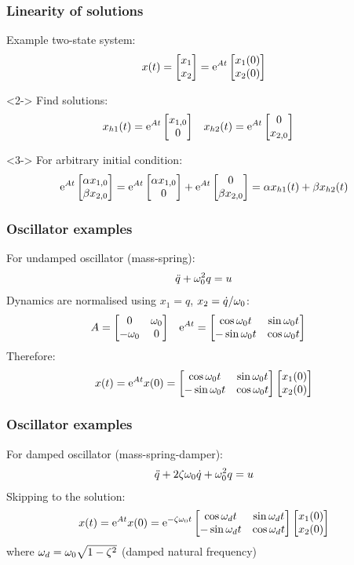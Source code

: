 \documentclass{beamer-control}
\begin{document}
\begin{frame}
\frametitle{Linearity of solutions}
Example two-state system:
\begin{align}
x(t) = \begin{bmatrix}x_1\\x_2\end{bmatrix} = \mathrm{e}^{At}\begin{bmatrix}x_1(0)\\x_2(0)\end{bmatrix}
\end{align}
\begin{uncoverenv}<2->
Find solutions:
\begin{align}
x_{h1}(t) &= \mathrm{e}^{At}\begin{bmatrix}x_{1,0}\\0\end{bmatrix} &
x_{h2}(t) &= \mathrm{e}^{At}\begin{bmatrix}0\\x_{2,0}\end{bmatrix} 
\end{align}
\end{uncoverenv}
\begin{uncoverenv}<3->
For arbitrary initial condition:
\begin{align}
\mathrm{e}^{At}\begin{bmatrix}\alpha x_{1,0}\\\beta x_{2,0}\end{bmatrix} = \mathrm{e}^{At}\begin{bmatrix}\alpha x_{1,0}\\0\end{bmatrix} + \mathrm{e}^{At}\begin{bmatrix}0\\\beta x_{2,0}\end{bmatrix} = \alpha x_{h1}(t) + \beta x_{h2}(t)
\end{align}
\end{uncoverenv}
\end{frame}

\begin{frame}
\frametitle{Oscillator examples}
For undamped oscillator (mass-spring):
\begin{align}
\ddot q + \omega_0^2 q  = u
\end{align}
Dynamics are normalised using $x_1=q$, $x_2 = \dot q/\omega_0$:
\begin{align}
A &= \begin{bmatrix}0 & \omega_0\\ -\omega_0 & 0\end{bmatrix} & \mathrm{e}^{At} &= \begin{bmatrix} \cos \omega_0 t & \sin \omega_0 t \\ -\sin \omega_0 t & \cos \omega_0 t\end{bmatrix}
\end{align}
Therefore:
\begin{align}
x(t) = \mathrm{e}^{At} x(0) = \begin{bmatrix} \cos \omega_0 t & \sin \omega_0 t \\ -\sin \omega_0 t & \cos \omega_0 t\end{bmatrix} \begin{bmatrix}x_1(0)\\ x_2(0)\end{bmatrix}
\end{align}
\end{frame}

\begin{frame}
\frametitle{Oscillator examples}
For damped oscillator (mass-spring-damper):
\begin{align}
\ddot q + 2 \zeta \omega_0 \dot q + \omega_0^2 q  = u
\end{align}
Skipping to the solution:
\begin{align}
x(t) = \mathrm{e}^{At} x(0) = \mathrm{e}^{-\zeta\omega_0 t} \begin{bmatrix} \cos \omega_d t & \sin \omega_d t \\ -\sin \omega_d t & \cos \omega_d t\end{bmatrix} \begin{bmatrix}x_1(0)\\ x_2(0)\end{bmatrix}
\end{align}
where $\omega_d = \omega_0 \sqrt{1-\zeta^2}$ (damped natural frequency)
\end{frame}
\end{document}
